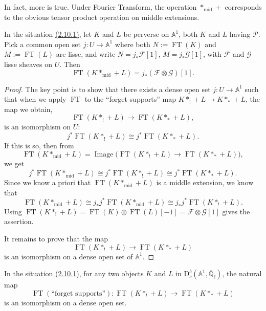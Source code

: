 In fact, more is true. Under Fourier Transform, the operation
\(*_{\mathrm{mid}}+\) corresponds to the obvious tensor product operation on
middle extensions.

In the situation \hyperref[par:2.10.1]{(2.10.1)}, let \(K\) and \(L\) be
perverse on \(\mathbb{A}^1\), both \(K\) and \(L\) having \(\mathcal{P}\). Pick
a common open set \(j:U\to\mathbb{A}^1\) where both \(N:=\operatorname{FT}(K)\)
and \(M:=\operatorname{FT}(L)\) are lisse, and write
\(N=j_*\mathcal{F}[1]\), \(M=j_*\mathcal{G}[1]\), with \(\mathcal{F}\) and
\(\mathcal{G}\) lisse sheaves on \(U\). Then
\[
  \operatorname{FT}(K*_{\mathrm{mid}}+L)=j_*(\mathcal{F}\otimes\mathcal{G})[1].
\]

\begin{proof}
The key point is to show that there exists a dense open set
\(j:U\to\mathbb{A}^1\) such that when we apply \(\operatorname{FT}\) to the
``forget supports'' map \(K*_!+L\to K*_*+L\), the map we obtain,
\[
  \operatorname{FT}(K*_!+L)\to\operatorname{FT}(K*_*+L),
\]
is an isomorphism on \(U\):
\[
  j^*\operatorname{FT}(K*_!+L)\cong j^*\operatorname{FT}(K*_*+L).
\]
If this is so, then from
\[
  \operatorname{FT}(K*_{\mathrm{mid}}+L)
    =\operatorname{Image}\bigl(\operatorname{FT}(K*_!+L)\to
      \operatorname{FT}(K*_*+L)\bigr),
\]
we get
\[
  j^*\operatorname{FT}(K*_{\mathrm{mid}}+L)
    \cong j^*\operatorname{FT}(K*_!+L)
    \cong j^*\operatorname{FT}(K*_*+L).
\]
Since we know a priori that \(\operatorname{FT}(K*_{\mathrm{mid}}+L)\) is a
middle extension, we know that
\[
  \operatorname{FT}(K*_{\mathrm{mid}}+L)
    \cong j_*j^*\operatorname{FT}(K*_{\mathrm{mid}}+L)
    \cong j_*j^*\operatorname{FT}(K*_!+L).
\]
Using
\(\operatorname{FT}(K*_!+L)=\operatorname{FT}(K)\otimes\operatorname{FT}(L)[-1]
=\mathcal{F}\otimes\mathcal{G}[1]\) gives the assertion.

It remains to prove that the map
\[
  \operatorname{FT}(K*_!+L)\to\operatorname{FT}(K*_*+L)
\]
is an isomorphism on a dense open set of \(\mathbb{A}^1\).
\end{proof}

In the situation \hyperref[par:2.10.1]{(2.10.1)}, for any two objects \(K\) and
\(L\) in \(\mathrm{D}^b_c(\mathbb{A}^1,\overline{\mathbb{Q}}_\ell)\), the
natural map
\[
  \operatorname{FT}(\text{``forget supports''}):
  \operatorname{FT}(K*_!+L)\to\operatorname{FT}(K*_*+L)
\]
is an isomorphism on a dense open set.

